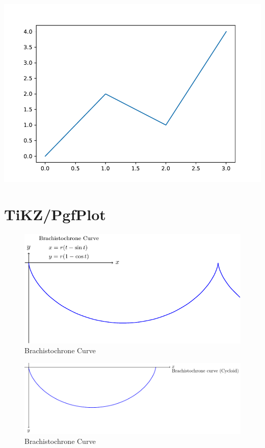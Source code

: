 \documentclass[
]{book}
\theoremstyle{definition}
\theoremstyle{definition}
\theoremstyle{definition}
\theoremstyle{definition}
\theoremstyle{remark}
\begin{document}
\includegraphics{202401292317-Python_files/figure-latex/unnamed-chunk-8-1.pdf}

\hypertarget{tikzpgfplot-1}{%
\chapter*{TiKZ/PgfPlot}\label{tikzpgfplot-1}}

\begin{figure}
\includegraphics[width=0.9\linewidth]{202401311000-TiKZ-PgfPlot_files/figure-latex/unnamed-chunk-1-1} \caption{Brachistochrone Curve}\label{fig:unnamed-chunk-1}
\end{figure}

\begin{figure}
\includegraphics[width=0.9\linewidth]{202401311000-TiKZ-PgfPlot_files/figure-latex/unnamed-chunk-2-1} \caption{Brachistochrone Curve}\label{fig:unnamed-chunk-2}
\end{figure}
\end{document}
